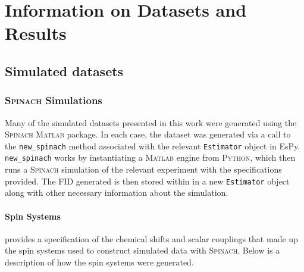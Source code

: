 \chapter{Information on Datasets and Results}
\label{chap:datasets}

\section{Simulated datasets}
\label{sec:simulated-datasets}

\subsection{\textsc{\textsc{Spinach}} Simulations}
Many of the simulated datasets presented in this work were generated using the
\textsc{Spinach} \textsc{Matlab} package\cite{Hogben2011}.
In each case, the dataset was generated via a call to the \texttt{new\_spinach}
method associated with the relevant \texttt{Estimator} object in \ac{EsPy}.
\texttt{new\_spinach} works by instantiating a \textsc{Matlab} engine from
\textsc{Python}\cite{MatlabEngine}, which then runs a \textsc{\textsc{Spinach}}
simulation of the relevant experiment with the specifications provided. The
\ac{FID} generated is then stored within in a new \texttt{Estimator} object
along with other necessary information about the simulation.

\subsubsection{Spin Systems}
 provides a specification of the chemical
shifts and scalar couplings that made up the spin systems used to construct
simulated data with \textsc{Spinach}. Below is a description of how the spin
systems were generated.
